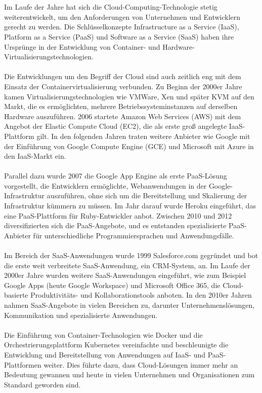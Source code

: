 \\\\
Im Laufe der Jahre hat sich die Cloud-Computing-Technologie stetig weiterentwickelt, um den Anforderungen von Unternehmen und Entwicklern gerecht zu werden. Die Schlüsselkonzepte Infrastructure as a Service (IaaS), Platform as a Service (PaaS) und Software as a Service (SaaS) haben ihre Ursprünge in der Entwicklung von Container- und Hardware-Virtualisierungstechnologien.
\\\\
Die Entwicklungen um den Begriff der Cloud sind auch zeitlich eng mit dem Einsatz der Containervirtualisierung verbunden. Zu Beginn der 2000er Jahre kamen Virtualisierungstechnologien wie VMWare, Xen und später KVM auf den Markt, die es ermöglichten, mehrere Betriebssysteminstanzen auf derselben Hardware auszuführen. 2006 startete Amazon Web Services (AWS) mit dem Angebot der Elastic Compute Cloud (EC2), die als erste groß angelegte IaaS-Plattform gilt. In den folgenden Jahren traten weitere Anbieter wie Google mit der Einführung von Google Compute Engine (GCE) und Microsoft mit Azure in den IaaS-Markt ein.
\\\\
Parallel dazu wurde 2007 die Google App Engine als erste PaaS-Lösung vorgestellt, die Entwicklern ermöglichte, Webanwendungen in der Google-Infrastruktur auszuführen, ohne sich um die Bereitstellung und Skalierung der Infrastruktur kümmern zu müssen. Im Jahr darauf wurde Heroku eingeführt, das eine PaaS-Plattform für Ruby-Entwickler anbot. Zwischen 2010 und 2012 diversifizierten sich die PaaS-Angebote, und es entstanden spezialisierte PaaS-Anbieter für unterschiedliche Programmiersprachen und Anwendungsfälle.
\\\\
Im Bereich der SaaS-Anwendungen wurde 1999 Salesforce.com gegründet und bot die erste weit verbreitete SaaS-Anwendung, ein CRM-System, an. Im Laufe der 2000er Jahre wurden weitere SaaS-Anwendungen eingeführt, wie zum Beispiel Google Apps (heute Google Workspace) und Microsoft Office 365, die Cloud-basierte Produktivitäts- und Kollaborationstools anboten. In den 2010er Jahren nahmen SaaS-Angebote in vielen Bereichen zu, darunter Unternehmenslösungen, Kommunikation und spezialisierte Anwendungen.
\\\\
Die Einführung von Container-Technologien wie Docker und die Orchestrierungsplattform Kubernetes  vereinfachte und beschleunigte die Entwicklung und Bereitstellung von Anwendungen auf IaaS- und PaaS-Plattformen weiter. Dies führte dazu, dass Cloud-Lösungen immer mehr an Bedeutung gewannen und heute in vielen Unternehmen und Organisationen zum Standard geworden sind.
